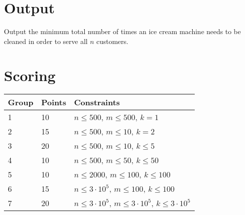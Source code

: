 \section*{Output}
Output the minimum total number of times an ice cream machine needs to be
cleaned in order to serve all $n$ customers.

\section*{Scoring}
\begin{tabular}{|l|l|l|}
    \hline
    Group & Points & Constraints \\ \hline
    1     &  10  & $n \leq 500$,          $m \leq 500$, $k = 1$ \\ \hline
    2     &  15  & $n \leq 500$,          $m \leq 10$, $k = 2$ \\ \hline
    3     &  20  & $n \leq 500$,          $m \leq 10$, $k \leq 5$ \\ \hline
    4     &  10  & $n \leq 500$,          $m \leq 50$, $k \leq 50$ \\ \hline
    5     &  10  & $n \leq 2000$,         $m \leq 100$, $k \leq 100$ \\ \hline
    6     &  15  & $n \leq 3 \cdot 10^5$, $m \leq 100$, $k \leq 100$ \\ \hline
    7     &  20  & $n \leq 3 \cdot 10^5$, $m \leq 3 \cdot 10^5$, $k \leq 3 \cdot 10^5$ \\ \hline
\end{tabular}

